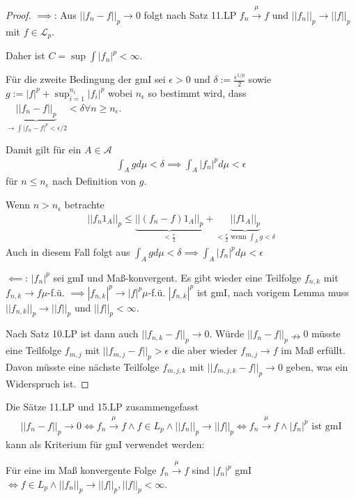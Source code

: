 \documentclass[]{article}
\begin{document}
\begin{proof}
	$\implies$: Aus $||f_n - f||_p \rightarrow 0$ folgt nach Satz 11.LP $f_n \xrightarrow{\mu}f$ und $||f_n||_p \rightarrow ||f||_p$ mit $f \in \mathcal{L}_p$.
	
	Daher ist $C = \sup \int |f_n|^p < \infty$.
	
	Für die zweite Bedingung der gmI sei $\epsilon > 0$ und $\delta := \frac{\epsilon^{1/p}}{2}$ sowie $g:= |f|^p + \sup_{i=1}^{n_\epsilon} |f_i|^p$ wobei $n_\epsilon$ so bestimmt wird, dass $\underbrace{||f_n - f||_p}_{\rightarrow\int |f_n - f|^p < \epsilon/2} < \delta \forall n \geq n_\epsilon$.
	
	Damit gilt für ein $A \in \mathcal{A}$
	\begin{align*}
		\int_A g d\mu < \delta \implies \int_A |f_n|^p d\mu < \epsilon
	\end{align*}
	für $n \leq n_\epsilon$ nach Definition von $g$.
	
	Wenn $n > n_\epsilon$ betrachte
	\begin{align*}
		||f_n 1_A||_p \leq \underbrace{||(f_n-f)1_A||_p}_{<\frac{\epsilon}{2}} + \underbrace{||f1_A||_p}_{<\frac{\epsilon}{2} \text{ wenn } \int_A g < \delta}
	\end{align*}
	Auch in diesem Fall folgt aus $\int_A g d\mu < \delta \implies \int_A |f_n|^p d\mu < \epsilon$
	
	$\impliedby$: $|f_n|^p$ sei gmI und Maß-konvergent. Es gibt wieder eine Teilfolge $f_{n,k}$ mit $f_{n,k}\rightarrow f \mu$-f.ü. $\implies |f_{n,k}|^p\rightarrow|f|^p \mu$-f.ü. $|f_{n,k}|^p$ ist gmI, nach vorigem Lemma muss $||f_{n,k}||_p \rightarrow ||f||_p$ und $||f||_p < \infty$.
	
	Nach Satz 10.LP ist dann auch $||f_{n,k}-f||_p \rightarrow 0$. Würde $||f_n-f||_p \nrightarrow 0$ müsste eine Teilfolge $f_{m,j}$ mit $||f_{m,j}-f||_p > \epsilon$ die aber wieder $f_{m,j}\rightarrow f$ im Maß erfüllt. Davon müsste eine nächste Teilfolge $f_{m,j,k}$ mit $||f_{m,j,k}-f||_p \rightarrow 0$ geben, was ein Widerspruch ist.
\end{proof}

Die Sätze 11.LP und 15.LP zusammengefasst
\begin{align*}
	||f_n - f||_p \rightarrow 0 \iff f_n \xrightarrow{\mu} f \land f\in L_p \land ||f_n||_p \rightarrow ||f||_p \iff f_n \xrightarrow{\mu} f \land |f_n|^p \text{ ist gmI}
\end{align*}
kann als Kriterium für gmI verwendet werden:

Für eine im Maß konvergente Folge $f_n \xrightarrow{\mu}f$ sind $|f_n|^p$ gmI $\iff f \in L_p \land ||f_n||_p \rightarrow ||f||_p, ||f||_p < \infty$.
\end{document}
